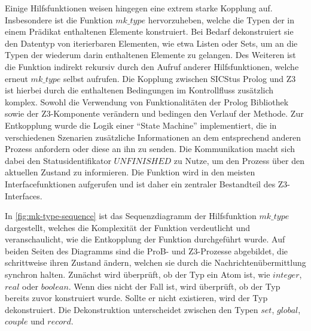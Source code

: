 Einige Hilfsfunktionen weisen hingegen eine extrem starke Kopplung auf.
Insbesondere ist die Funktion $mk\_type$ hervorzuheben, welche die Typen der in einem Prädikat enthaltenen Elemente konstruiert.
Bei Bedarf dekonstruiert sie den Datentyp von iterierbaren Elementen, wie etwa Listen oder Sets, um an die Typen der wiederum darin enthaltenen Elemente zu gelangen.
Des Weiteren ist die Funktion indirekt rekursiv durch den Aufruf anderer Hilfsfunktionen, welche erneut $mk\_type$ selbst aufrufen.
Die Kopplung zwischen SICStus Prolog und Z3 ist hierbei durch die enthaltenen Bedingungen im Kontrollfluss zusätzlich komplex.
Sowohl die Verwendung von Funktionalitäten der Prolog Bibliothek sowie der Z3-Komponente verändern und bedingen den Verlauf der Methode.
Zur Entkopplung wurde die Logik einer \enquote{State Machine} implementiert, die in verschiedenen Szenarien zusätzliche Informationen
an dem entsprechend anderen Prozess anfordern oder diese an ihn zu senden.
Die Kommunikation macht sich dabei den Statusidentifikator $UNFINISHED$ zu Nutze, um den Prozess über den aktuellen Zustand zu informieren.
Die Funktion wird in den meisten Interfacefunktionen aufgerufen und ist daher ein zentraler Bestandteil des Z3-Interfaces.

In \cref{fig:mk-type-sequence} ist das Sequenzdiagramm der Hilfsfunktion $mk\_type$ dargestellt, welches die Komplexität der Funktion verdeutlicht
und veranschaulicht, wie die Entkopplung der Funktion durchgeführt wurde.
Auf beiden Seiten des Diagramms sind die ProB- und Z3-Prozesse abgebildet, die schrittweise ihren Zustand ändern, welchen sie durch die Nachrichtenübermittlung synchron halten.
Zunächst wird überprüft, ob der Typ ein Atom ist, wie $integer$, $real$ oder $boolean$.
Wenn dies nicht der Fall ist, wird überprüft, ob der Typ bereits zuvor konstruiert wurde.
Sollte er nicht existieren, wird der Typ dekonstruiert. Die Dekonstruktion unterscheidet zwischen den Typen $set$, $global$, $couple$ und $record$.

